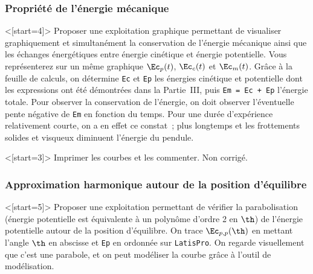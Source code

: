 \documentclass[../main/main.tex]{subfiles}
\begin{document}
\subsubsection{Propriété de l'énergie mécanique}

\QR<[start=4]>{%
	Proposer une exploitation graphique permettant de visualiser
	graphiquement et simultanément la conservation de l'énergie mécanique
	ainsi que les échanges énergétiques entre énergie cinétique et énergie
	potentielle. Vous représenterez sur un même graphique $\Ec_p(t)$,
	$\Ec_c(t)$ et $\Ec_m(t)$.
}{%
	Grâce à la feuille de calculs, on détermine \texttt{Ec} et \texttt{Ep} les
	énergies cinétique et potentielle dont les expressions ont été démontrées dans
	la Partie~III, puis \texttt{Em = Ec + Ep} l'énergie totale.
	\smallbreak
	Pour observer la conservation de l'énergie, on doit observer l'éventuelle
	pente négative de \texttt{Em} en fonction du temps. Pour une durée
	d'expérience relativement courte, on a en effet ce constat~; plus longtemps et
	les frottements solides et visqueux diminuent l'énergie du pendule.
}

\QR<[start=3]>{%
	Imprimer les courbes et les commenter.
}{%
	Non corrigé.
}

\subsubsection{Approximation harmonique autour de la position d'équilibre}

\QR<[start=5]>{%
	Proposer une exploitation permettant de vérifier la parabolisation
	(énergie potentielle est équivalente à un polynôme d'ordre 2 en $\th$)
	de l'énergie potentielle autour de la position d'équilibre.
}{%
	On trace $\Ec_{p,p}(\th)$ en mettant l'angle $\th$ en abscisse et \texttt{Ep}
	en ordonnée sur \texttt{LatisPro}. On regarde visuellement que c'est une
	parabole, et on peut modéliser la courbe grâce à l'outil de modélisation.
}
\end{document}
